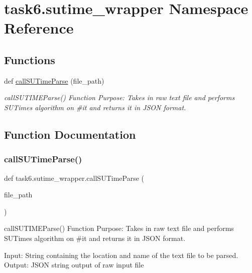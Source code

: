 \hypertarget{namespacetask6_1_1sutime__wrapper}{}\section{task6.\+sutime\+\_\+wrapper Namespace Reference}
\label{namespacetask6_1_1sutime__wrapper}
\subsection*{Functions}
\begin{DoxyCompactItemize}
\item 
def \hyperlink{namespacetask6_1_1sutime__wrapper_af4cac751d594757efbe539a28850ff28}{call\+S\+U\+Time\+Parse} (file\+\_\+path)
\begin{DoxyCompactList}\small\item\em call\+S\+U\+T\+I\+M\+E\+Parse() Function Purpose\+: Takes in raw text file and performs S\+U\+Time\textquotesingle{}s algorithm on \#it and returns it in J\+S\+ON format. \end{DoxyCompactList}\end{DoxyCompactItemize}


\subsection{Function Documentation}
\mbox{\label{namespacetask6_1_1sutime__wrapper_af4cac751d594757efbe539a28850ff28}} 
\subsubsection{\texorpdfstring{call\+S\+U\+Time\+Parse()}{callSUTimeParse()}}
{\footnotesize\ttfamily def task6.\+sutime\+\_\+wrapper.\+call\+S\+U\+Time\+Parse (\begin{DoxyParamCaption}\item[{}]{file\+\_\+path }\end{DoxyParamCaption})}



call\+S\+U\+T\+I\+M\+E\+Parse() Function Purpose\+: Takes in raw text file and performs S\+U\+Time\textquotesingle{}s algorithm on \#it and returns it in J\+S\+ON format. 

Input\+: String containing the location and name of the text file to be parsed. Output\+: J\+S\+ON string output of raw input file 